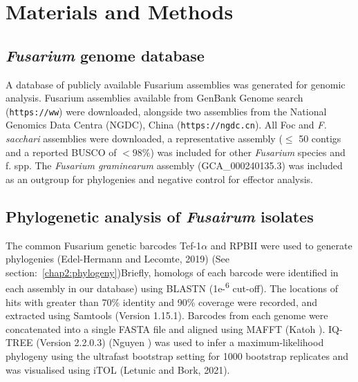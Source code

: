 \section{Materials and Methods}

\subsection{\textit{Fusarium} genome database}\label{chap3:fusariumdb}
A database of publicly available Fusarium assemblies was generated for genomic analysis. Fusarium assemblies available from GenBank Genome search (\texttt{https://ww}) were downloaded, alongside two \Foc assemblies from the National Genomics Data Centra (NGDC), China (\texttt{https://ngdc.cn}). All Foc and \textit{F. sacchari }assemblies were downloaded, a representative assembly (\( \leq \) 50 contigs and a reported BUSCO of \(<98\% \)) was included for other \textit{Fusarium} species and f. spp. The \textit{Fusarium graminearum} assembly (GCA\_000240135.3) was included as an outgroup for phylogenies and negative control for effector analysis.

\subsection{Phylogenetic analysis of \textit{Fusairum} isolates}
The common Fusarium genetic barcodes Tef-1\(\alpha\) and RPBII  were used to generate phylogenies (Edel-Hermann and Lecomte, 2019) (See section:~\ref{chap2:phylogeny})Briefly, homologs of each barcode were identified in each assembly in our database) using BLASTN (1e-\textsuperscript{6} cut-off). The locations of hits with greater than 70\% identity and 90\% coverage were recorded, and extracted using Samtools (Version 1.15.1). Barcodes from each genome were concatenated into a single FASTA file and aligned using MAFFT (Katoh ). IQ-TREE (Version 2.2.0.3) (Nguyen ) was used to infer a maximum-likelihood phylogeny using the ultrafast bootstrap setting for 1000 bootstrap replicates and was visualised using iTOL (Letunic and Bork, 2021). 

